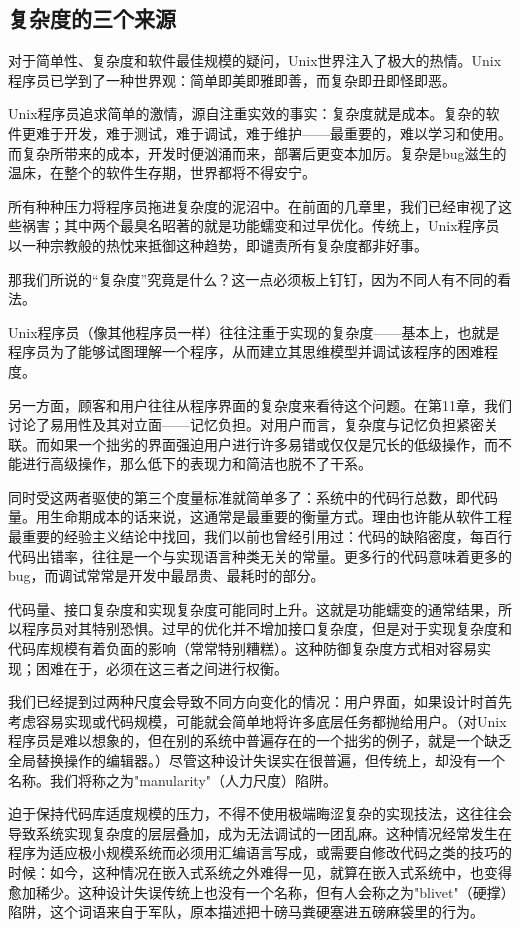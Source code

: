 \documentclass[12pt,oneside]{book}
\begin{document}
\subsection{复杂度的三个来源}
对于简单性、复杂度和软件最佳规模的疑问，Unix世界注入了极大的热情。Unix程序员已学到了一种世界观：简单即美即雅即善，而复杂即丑即怪即恶。

Unix程序员追求简单的激情，源自注重实效的事实：复杂度就是成本。复杂的软件更难于开发，难于测试，难于调试，难于维护——最重要的，难以学习和使用。而复杂所带来的成本，开发时便汹涌而来，部署后更变本加厉。复杂是bug滋生的温床，在整个的软件生存期，世界都将不得安宁。

所有种种压力将程序员拖进复杂度的泥沼中。在前面的几章里，我们已经审视了这些祸害；其中两个最臭名昭著的就是功能蠕变和过早优化。传统上，Unix程序员以一种宗教般的热忱来抵御这种趋势，即谴责所有复杂度都非好事。

那我们所说的“复杂度”究竟是什么？这一点必须板上钉钉，因为不同人有不同的看法。

Unix程序员（像其他程序员一样）往往注重于实现的复杂度——基本上，也就是程序员为了能够试图理解一个程序，从而建立其思维模型并调试该程序的困难程度。

另一方面，顾客和用户往往从程序界面的复杂度来看待这个问题。在第11章，我们讨论了易用性及其对立面——记忆负担。对用户而言，复杂度与记忆负担紧密关联。而如果一个拙劣的界面强迫用户进行许多易错或仅仅是冗长的低级操作，而不能进行高级操作，那么低下的表现力和简洁也脱不了干系。

同时受这两者驱使的第三个度量标准就简单多了：系统中的代码行总数，即代码量。用生命期成本的话来说，这通常是最重要的衡量方式。理由也许能从软件工程最重要的经验主义结论中找回，我们以前也曾经引用过：代码的缺陷密度，每百行代码出错率，往往是一个与实现语言种类无关的常量。更多行的代码意味着更多的bug，而调试常常是开发中最昂贵、最耗时的部分。

代码量、接口复杂度和实现复杂度可能同时上升。这就是功能蠕变的通常结果，所以程序员对其特别恐惧。过早的优化并不增加接口复杂度，但是对于实现复杂度和代码库规模有着负面的影响（常常特别糟糕）。这种防御复杂度方式相对容易实现；困难在于，必须在这三者之间进行权衡。

我们已经提到过两种尺度会导致不同方向变化的情况：用户界面，如果设计时首先考虑容易实现或代码规模，可能就会简单地将许多底层任务都抛给用户。（对Unix程序员是难以想象的，但在别的系统中普遍存在的一个拙劣的例子，就是一个缺乏全局替换操作的编辑器。）尽管这种设计失误实在很普遍，但传统上，却没有一个名称。我们将称之为"manularity"（人力尺度）陷阱。

迫于保持代码库适度规模的压力，不得不使用极端晦涩复杂的实现技法，这往往会导致系统实现复杂度的层层叠加，成为无法调试的一团乱麻。这种情况经常发生在程序为适应极小规模系统而必须用汇编语言写成，或需要自修改代码之类的技巧的时候：如今，这种情况在嵌入式系统之外难得一见，就算在嵌入式系统中，也变得愈加稀少。这种设计失误传统上也没有一个名称，但有人会称之为"blivet"（硬撑）陷阱，这个词语来自于军队，原本描述把十磅马粪硬塞进五磅麻袋里的行为。
\end{document}

